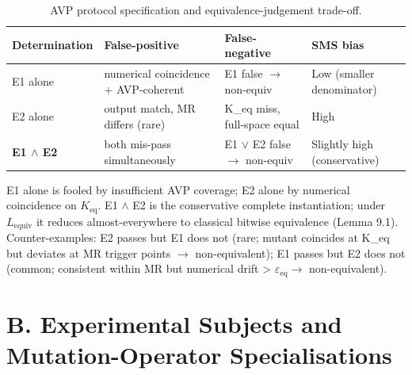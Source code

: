 \documentclass[acmsmall,screen,review]{acmart}
\begin{document}
{\def\LTcaptype{table} %
\begin{longtable}[]{@{}
  >{\raggedright\arraybackslash}p{}
  >{\raggedright\arraybackslash}p{}
  >{\raggedright\arraybackslash}p{}
  >{\raggedright\arraybackslash}p{}@{}}
\caption{AVP protocol specification and equivalence-judgement trade-off.}\label{tab:p2-16}\\
\toprule\noalign{}
\begin{minipage}[b]{\linewidth}\raggedright
Determination
\end{minipage} & \begin{minipage}[b]{\linewidth}\raggedright
False-positive
\end{minipage} & \begin{minipage}[b]{\linewidth}\raggedright
False-negative
\end{minipage} & \begin{minipage}[b]{\linewidth}\raggedright
SMS bias
\end{minipage} \\
\midrule\noalign{}
\endfirsthead
\endhead
\bottomrule\noalign{}
\endlastfoot
E1 alone & numerical coincidence + AVP-coherent & E1 false $\to$ non-equiv &
Low (smaller denominator) \\
E2 alone & output match, MR differs (rare) & K\_eq miss, full-space
equal & High \\
\textbf{E1 $\wedge$ E2} & both mis-pass simultaneously & E1 $\vee$ E2 false $\to$ non-equiv
& Slightly high (conservative) \\
\end{longtable}
}

E1 alone is fooled by insufficient AVP coverage; E2 alone by numerical
coincidence on $K_{\mathrm{eq}}$. E1 $\wedge$ E2 is the conservative complete
instantiation; under $L_{\mathrm{equiv}}$ it reduces almost-everywhere to
classical bitwise equivalence (Lemma 9.1). Counter-examples: E2 passes
but E1 does not (rare; mutant coincides at K\_eq but deviates at MR
trigger points $\to$ non-equivalent); E1 passes but E2 does not (common;
consistent within MR but numerical drift \textgreater{} $\varepsilon_{\mathrm{eq}} \to$
non-equivalent).


\section{B. Experimental Subjects and Mutation-Operator Specialisations}\label{b.-experimental-subjects-and-mutation-operator-specialisations}
\end{document}
